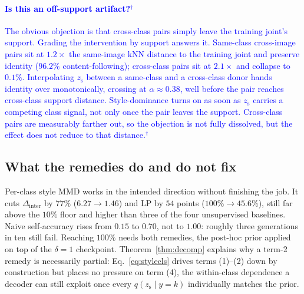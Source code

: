 \documentclass[letterpaper]{article} %
\newcommand{\pj}[1]{\textcolor{blue}{#1$^{\dagger}$}}
\newcommand{\zs}{z_{\mathrm{s}}}
\newcommand{\Dinter}{\Delta_{\mathrm{inter}}}
\begin{document}
\paragraph{\pj{Is this an off-support artifact?}}
\pj{The obvious objection is that cross-class pairs simply leave the training
joint's support. Grading the intervention by support answers it. Same-class
cross-image pairs sit at $1.2\times$ the same-image kNN distance to the
training joint and preserve identity ($96.2\%$ content-following);
cross-class pairs sit at $2.1\times$ and collapse to $0.1\%$. Interpolating
$\zs$ between a same-class and a cross-class donor hands identity over
monotonically, crossing at $\alpha\approx0.38$, well before the pair reaches
cross-class support distance. Style-dominance turns on as soon as $\zs$
carries a competing class signal, not only once the pair leaves the support.
Cross-class pairs are measurably farther out, so the objection is not fully
dissolved, but the effect does not reduce to that distance.}

\subsection{What the remedies do and do not fix}
\label{sec:exp-remedy}

Per-class style MMD works in the intended direction without finishing the
job. It cuts $\Dinter$ by $77\%$ ($6.27\to1.46$) and LP by $54$ points
($100\%\to45.6\%$), still far above the $10\%$ floor and higher than three of
the four unsupervised baselines. Naive self-accuracy rises from $0.15$ to
$0.70$, not to $1.00$: roughly three generations in ten still fail. Reaching
$100\%$ needs both remedies, the post-hoc prior applied on top of the
$\delta{=}1$ checkpoint. Theorem~\ref{thm:decomp} explains why a term-2
remedy is necessarily partial: Eq.~\ref{eq:stylecls} drives terms (1)--(2)
down by construction but places no pressure on term (4), the within-class
dependence a decoder can still exploit once every $q(\zs\mid y{=}k)$
individually matches the prior.
\end{document}
